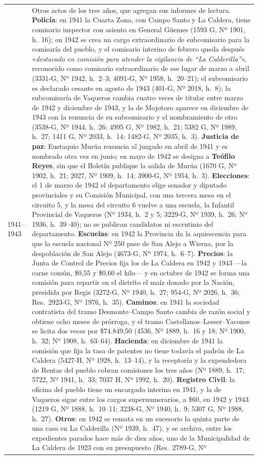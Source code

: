 \begin{longtable}{@{}p{2.7cm}p{10.3cm}@{}}
1941--1943 & Otros actos de los tres años, que agregan sus informes de lectura. \textbf{Policía}: en 1941 la Cuarta Zona, con Campo Santo y La Caldera, tiene comisario inspector con asiento en General Güemes (1593 G, Nº 1901, h.\ 16); en 1942 se crea un cargo extraordinario de subcomisario para la comisaría del pueblo, y el comisario interino de febrero queda después «\textit{destacado en comisión para atender la vigilancia de “La Calderilla”}», reconocido como comisario extraordinario de ese lugar de marzo a abril (3331-G, Nº 1942, h.\ 2--3; 4091-G, Nº 1958, h.\ 20--21); el subcomisario es declarado cesante en agosto de 1943 (401-G, Nº 2018, h.\ 8); la subcomisaría de Vaqueros cambia cuatro veces de titular entre marzo de 1942 y diciembre de 1943, y la de Mojotoro aparece en diciembre de 1943 con la renuncia de su subcomisario y el nombramiento de otro (3538-G, Nº 1944, h.\ 26; 4995 G, Nº 1982, h.\ 21; 5382 G, Nº 1989, h.\ 27; 1411 G, Nº 2033, h.\ 14; 1482-G, Nº 2035, h.\ 3). \textbf{Justicia de paz}: Eustaquio Murúa renuncia al juzgado en abril de 1941 y es nombrado otra vez en junio; en mayo de 1942 se designa a \textbf{Teófilo Reyes}\index{Reyes, Teófilo}, sin que el Boletín publique la salida de Murúa (1670 G, Nº 1902, h.\ 21; 2027, Nº 1909, h.\ 14; 3900-G, Nº 1954, h.\ 3). \textbf{Elecciones}: el 1 de marzo de 1942 el departamento elige senador y diputado provinciales y su Comisión Municipal, con una tercera mesa en el circuito 5, y la mesa del circuito 6 vuelve a una escuela, la Infantil Provincial de Vaqueros (Nº 1934, h.\ 2 y 5; 3229-G, Nº 1939, h.\ 26; Nº 1936, h.\ 39--40); no se publican candidatos ni escrutinio del departamento. \textbf{Escuelas}: en 1942 la Provincia da la aquiescencia para que la escuela nacional Nº 250 pase de San Alejo a Wierna, por la despoblación de San Alejo (4673-G, Nº 1974, h.\ 6--7). \textbf{Precios}: la Junta de Control de Precios fija los de La Caldera en 1942 y 1943 ---la carne común, \$0,55 y \$0,60 el kilo--- y en octubre de 1942 se forma una comisión para repartir en el distrito el maíz donado por la Nación, presidida por Regis (3272-G, Nº 1940, h.\ 27; 954-G, Nº 2026, h.\ 36; Res.\ 2923-G, Nº 1976, h.\ 35). \textbf{Caminos}: en 1941 la sociedad contratista del tramo Desmonte--Campo Santo cambia de razón social y obtiene ocho meses de prórroga, y el tramo Castellanos--Lesser--Yacones se licita dos veces por \$74.849,50 (4536, Nº 1889, h.\ 16 y 18; Nº 1900, h.\ 32; Nº 1908, h.\ 63--64). \textbf{Hacienda}: en diciembre de 1941 la comisión que fija la tasa de patentes no tiene todavía el padrón de La Caldera (5427-H, Nº 1928, h.\ 13--14), y la receptoría y la expendedora de Rentas del pueblo cobran comisiones los tres años (Nº 1889, h.\ 17; 5722, Nº 1941, h.\ 33; 7037 H, Nº 1992, h.\ 20). \textbf{Registro Civil}: la oficina del pueblo tiene un encargado interino en 1941, y la de Vaqueros sigue entre los cargos supernumerarios, a \$60, en 1942 y 1943 (1219 G, Nº 1888, h.\ 10--11; 3238-G, Nº 1940, h.\ 9; 5307 G, Nº 1988, h.\ 27). \textbf{Otros}: en 1942 se remata en un sucesorio la quinta parte de una casa en La Calderilla (Nº 1939, h.\ 47), y se archiva, entre los expedientes parados hace más de diez años, uno de la Municipalidad de La Caldera de 1923 con su presupuesto (Res.\ 2789-G, Nº 
\end{longtable}
